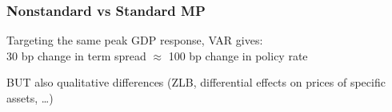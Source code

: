 \documentclass[pdflatex,aspectratio=169]{beamer}
\newcommand{\jemph}[1]{{\color{StataDarkBlue}#1}}
\begin{document}
\begin{frame}\frametitle{\bf Nonstandard vs Standard MP}


\bi
\item Targeting the same peak GDP response, VAR gives:\\ \jemph{30 bp change in term spread ${}\approx{}$ 100 bp change in policy rate}
\item BUT also qualitative differences (ZLB, differential effects on prices of specific assets, \dots)
\ei

\end{frame}






\end{document}
